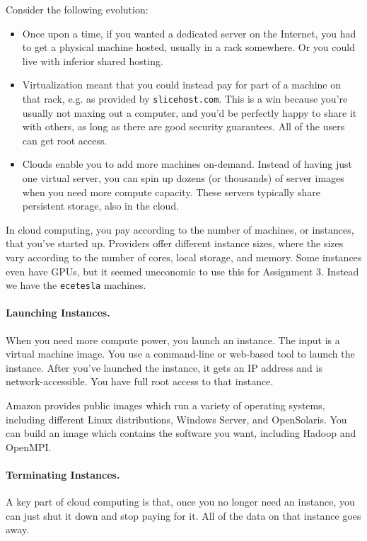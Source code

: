 \documentclass[a4paper]{report}
\begin{document}
Consider the following evolution:
\begin{itemize}
\item Once upon a time, if you wanted a dedicated server on the
  Internet, you had to get a physical machine hosted, usually in a
  rack somewhere. Or you could live with inferior shared hosting.
\item Virtualization meant that you could instead pay for part of a
  machine on that rack, e.g. as provided by {\tt slicehost.com}.  This
  is a win because you're usually not maxing out a computer, and you'd
  be perfectly happy to share it with others, as long as there are
  good security guarantees. All of the users can get root access.
\item Clouds enable you to add more machines on-demand. Instead of
  having just one virtual server, you can spin up dozens (or
  thousands) of server images when you need more compute
  capacity. These servers typically share persistent storage, also in
  the cloud. 
\end{itemize}

In cloud computing, you pay according to the number of machines, or
instances, that you've started up. Providers offer different instance
sizes, where the sizes vary according to the number of cores, local
storage, and memory. Some instances even have GPUs, but it seemed 
uneconomic to use this for Assignment 3. Instead we have the {\tt ecetesla} machines.

\paragraph{Launching Instances.} When you need more compute power,
you launch an instance. The input is a virtual machine image.  You use
a command-line or web-based tool to launch the instance.  After you've
launched the instance, it gets an IP address and is
network-accessible. You have full root access to that instance.

Amazon provides public images which run a variety of operating
systems, including different Linux distributions, Windows Server, and
OpenSolaris. You can build an image which contains the software you
want, including Hadoop and OpenMPI.

\paragraph{Terminating Instances.} A key part of cloud computing is
that, once you no longer need an instance, you can just shut it down
and stop paying for it. All of the data on that instance goes away.
\end{document}
